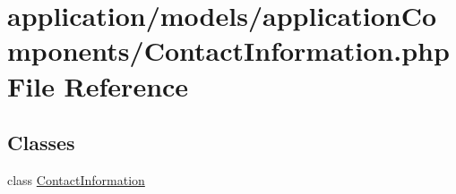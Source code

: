 \hypertarget{_contact_information_8php}{\section{application/models/application\-Components/\-Contact\-Information.php File Reference}
\label{_contact_information_8php}
}
\subsection*{Classes}
\begin{DoxyCompactItemize}
\item 
class \hyperlink{class_contact_information}{Contact\-Information}
\end{DoxyCompactItemize}
